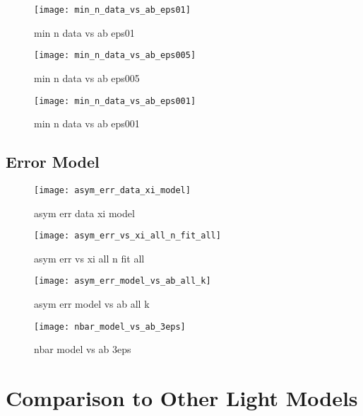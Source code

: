 \begin{figure}[H]
  \centering
  \texttt{[image: min\_n\_data\_vs\_ab\_eps01]}
  \caption{min n data vs ab eps01}
  \label{fig:min_n_data_vs_ab_eps01}
\end{figure}

\begin{figure}[H]
  \centering
  \texttt{[image: min\_n\_data\_vs\_ab\_eps005]}
  \caption{min n data vs ab eps005}
  \label{fig:min_n_data_vs_ab_eps005}
\end{figure}

\begin{figure}[H]
  \centering
  \texttt{[image: min\_n\_data\_vs\_ab\_eps001]}
  \caption{min n data vs ab eps001}
  \label{fig:min_n_data_vs_ab_eps001}
\end{figure}

\subsection{Error Model}

\begin{figure}[H]
  \centering
  \texttt{[image: asym\_err\_data\_xi\_model]}
  \caption{asym err data xi model}
  \label{fig:asym_err_data_xi_model}
\end{figure}

\begin{figure}[H]
  \centering
  \texttt{[image: asym\_err\_vs\_xi\_all\_n\_fit\_all]}
  \caption{asym err vs xi all n fit all}
  \label{fig:asym_err_vs_xi_all_n_fit_all}
\end{figure}

\begin{figure}[H]
  \centering
  \texttt{[image: asym\_err\_model\_vs\_ab\_all\_k]}
  \caption{asym err model vs ab all k}
  \label{fig:asym_err_model_vs_ab_all_k}
\end{figure}

\begin{figure}[H]
  \centering
  \texttt{[image: nbar\_model\_vs\_ab\_3eps]}
  \caption{nbar model vs ab 3eps}
  \label{fig:nbar_model_vs_ab_3eps}
\end{figure}


\section{Comparison to Other Light Models}

